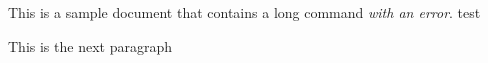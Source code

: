 \documentclass{article}
\begin{document}
This is a sample document that contains a long 
command \textit{with an error}. test

This is the next paragraph
\end{document}
